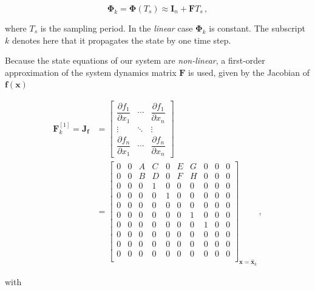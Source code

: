 \begin{equation}
  \bm{\Phi}_{k} = \bm{\Phi}(T_s) \approx \mathbf{I}_{n} + \mathbf{F} T_s\,,
\end{equation}

\noindent
where $T_s$ is the sampling period. In the \emph{linear} case $\bm{\Phi}_{k}$ is constant. The subscript $k$ denotes here that it propagates the state by one time step.

Because the state equations of our system are \emph{non-linear}, a first-order approximation of the system dynamics matrix $\mathbf{F}$ is used, given by the Jacobian of $\mathbf{f}(\mathbf{x})$

\begin{equation}
\begin{split}
\mathbf{F}^{[1]}_k = \mathbf{J}_{\mathbf{f}} &= \begin{bmatrix}
    \dfrac{\partial f_1}{\partial x_1} & \cdots & \dfrac{\partial f_1}{\partial x_{n}}\\
    \vdots & \ddots & \vdots\\
    \dfrac{\partial f_{n}}{\partial x_1} & \cdots & \dfrac{\partial f_{n}}{\partial x_{n}} \end{bmatrix} \\
&=\begin{bmatrix}
  0 & 0 & A & C & 0 & E & G & 0 & 0 & 0\\
  0 & 0 & B & D & 0 & F & H & 0 & 0 & 0\\
  0 & 0 & 0 & 1 & 0 & 0 & 0 & 0 & 0 & 0\\
  0 & 0 & 0 & 0 & 1 & 0 & 0 & 0 & 0 & 0\\
  0 & 0 & 0 & 0 & 0 & 0 & 0 & 0 & 0 & 0\\
  0 & 0 & 0 & 0 & 0 & 0 & 1 & 0 & 0 & 0\\
  0 & 0 & 0 & 0 & 0 & 0 & 0 & 1 & 0 & 0\\
  0 & 0 & 0 & 0 & 0 & 0 & 0 & 0 & 0 & 0\\
  0 & 0 & 0 & 0 & 0 & 0 & 0 & 0 & 0 & 0\\
  0 & 0 & 0 & 0 & 0 & 0 & 0 & 0 & 0 & 0\\
\end{bmatrix}_{\mathbf{x}=\hat{\mathbf{x}}_{k}}\,,
\end{split}
\end{equation}

\noindent
with

